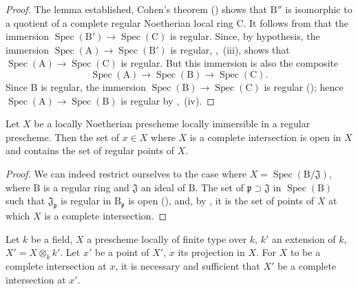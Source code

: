 \begin{proof}
The lemma established, Cohen's theorem () shows that $\mathrm{B}''$ is isomorphic to a quotient of a complete regular Noetherian local ring $\mathrm{C}$.
It follows from  that the immersion $\operatorname{Spec}(\mathrm{B}')\to\operatorname{Spec}(\mathrm{C})$ is regular. Since, by hypothesis, the immersion $\operatorname{Spec}(\mathrm{A})\to\operatorname{Spec}(\mathrm{B}')$ is regular, ,~(iii), shows that $\operatorname{Spec}(\mathrm{A})\to\operatorname{Spec}(\mathrm{C})$ is regular. But this immersion is also the composite
\[
  \operatorname{Spec}(\mathrm{A})\longrightarrow\operatorname{Spec}(\mathrm{B})\longrightarrow\operatorname{Spec}(\mathrm{C}).
\]
Since $\mathrm{B}$ is regular, the immersion $\operatorname{Spec}(\mathrm{B})\to\operatorname{Spec}(\mathrm{C})$ is regular (); hence $\operatorname{Spec}(\mathrm{A})\to\operatorname{Spec}(\mathrm{B})$ is regular by ,~(iv).
\end{proof}

\begin{corollary}[19.3.3]
\label{IV.19.3.3}
Let $X$ be a locally Noetherian prescheme locally immersible in a regular prescheme.
Then the set of $x\in X$ where $X$ is a complete intersection is open in $X$ and contains the set of regular points of $X$.
\end{corollary}

\begin{proof}
We can indeed restrict ourselves to the case where $X=\operatorname{Spec}(\mathrm{B}/\mathfrak{J})$, where $\mathrm{B}$ is a regular ring and $\mathfrak{J}$ an ideal of $\mathrm{B}$.
The set of $\mathfrak{p}\supset\mathfrak{J}$ in $\operatorname{Spec}(\mathrm{B})$ such that $\mathfrak{J}_\mathfrak{p}$ is regular in $\mathrm{B}_\mathfrak{p}$ is open (), and, by , it is the set of points of $X$ at which $X$ is a complete intersection.
\end{proof}

\begin{corollary}[19.3.4]
\label{IV.19.3.4}
Let $k$ be a field, $X$ a prescheme locally of finite type over $k$, $k'$ an extension of $k$, $X'=X\otimes_k k'$.
Let $x'$ be a point of $X'$, $x$ its projection in $X$.
For $X$ to be a complete intersection at $x$, it is necessary and sufficient that $X'$ be a complete intersection at $x'$.
\end{corollary}

